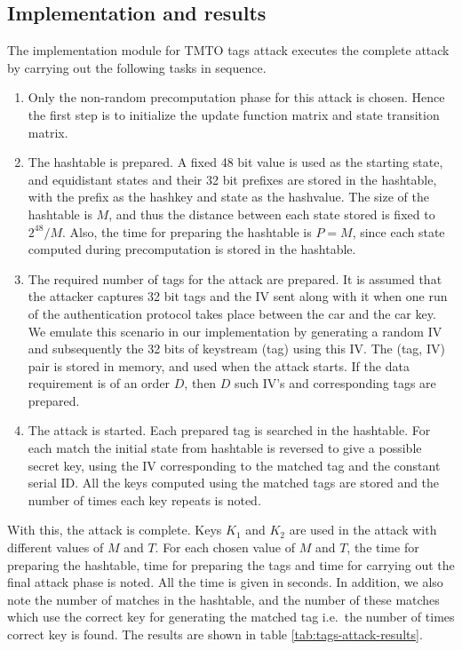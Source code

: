 \subsection{Implementation and results}

The implementation module for TMTO tags attack executes the complete attack by carrying out the following tasks in sequence. 

\begin{enumerate}

\item Only the non-random precomputation phase for this attack is chosen. Hence the first step is to initialize the update function matrix and state transition matrix.
\item The hashtable is prepared. A fixed 48 bit value is used as the starting state, and equidistant states and their 32 bit prefixes are stored in the hashtable, with the prefix as the hashkey and state as the hashvalue. The size of the hashtable is $M$, and thus the distance between each state stored is fixed to $2^{48}/M$. Also, the time for preparing the hashtable is $P = M$, since each state computed during precomputation is stored in the hashtable.  
\item The required number of tags for the attack are prepared. It is assumed that the attacker captures 32 bit tags and the IV sent along with it when one run of the authentication protocol takes place between the car and the car key. We emulate this scenario in our implementation by generating a random IV and subsequently the 32 bits of keystream (tag) using this IV. The (tag, IV) pair is stored in memory, and used when the attack starts. If the data requirement is of an order $D$, then $D$ such IV's and corresponding tags are prepared. 
\item The attack is started. Each prepared tag is searched in the hashtable. For each match the initial state from hashtable is reversed to give a possible secret key, using the IV corresponding to the matched tag and the constant serial ID. All the keys computed using the matched tags are stored and the number of times each key repeats is noted. 
\end{enumerate}

With this, the attack is complete. Keys $K_1$ and $K_2$ are used in the attack with different values of $M$ and $T$. For each chosen value of $M$ and $T$, the time for preparing the hashtable, time for preparing the tags and time for carrying out the final attack phase is noted. All the time is given in seconds. In addition, we also note the number of matches in the hashtable, and the number of these matches which use the correct key for generating the matched tag i.e.~the number of times correct key is found. The results are shown in table \ref{tab:tags-attack-results}.

